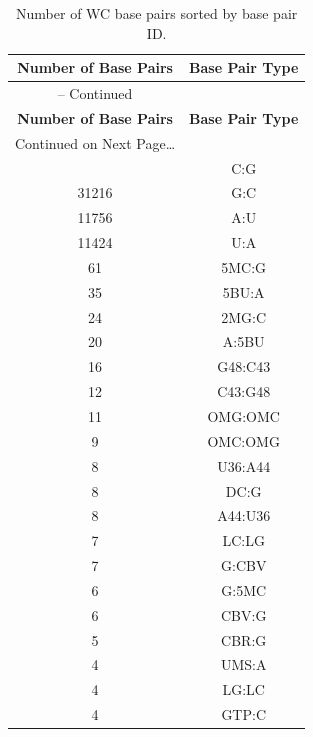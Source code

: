 \begin{center}
\begin{longtable}{c|c}
\caption{Number of WC base pairs sorted by base pair ID.}
\label{tab:allWC}\\ 
\hline \hline 
\bf{Number of Base Pairs} & \bf{Base Pair Type} \\\hline
\endfirsthead

\multicolumn{1}{c}{{\tablename} \thetable{} -- Continued} \\
\hline \hline 
\bf{Number of Base Pairs} & \bf{Base Pair Type} \\\hline
\endhead

\multicolumn{1}{l}{Continued on Next Page\ldots} \\
\endfoot
\endlastfoot
  33036 & C:G      \\ \hline
  31216 & G:C      \\ \hline
  11756 & A:U      \\ \hline
  11424 & U:A      \\ \hline
     61 & 5MC:G    \\ \hline
     35 & 5BU:A    \\ \hline
     24 & 2MG:C    \\ \hline
     20 & A:5BU    \\ \hline
     16 & G48:C43  \\ \hline
     12 & C43:G48  \\ \hline
     11 & OMG:OMC  \\ \hline
      9 & OMC:OMG  \\ \hline
      8 & U36:A44  \\ \hline
      8 & DC:G     \\ \hline
      8 & A44:U36  \\ \hline
      7 & LC:LG    \\ \hline
      7 & G:CBV    \\ \hline
      6 & G:5MC    \\ \hline
      6 & CBV:G    \\ \hline
      5 & CBR:G    \\ \hline
      4 & UMS:A    \\ \hline
      4 & LG:LC    \\ \hline
      4 & GTP:C    \\ \hline

\end{longtable}
\end{center}
